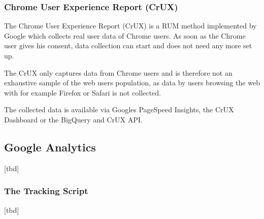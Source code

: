 







\subsubsection{Chrome User Experience Report (CrUX)}


The Chrome User Experience Report (CrUX) is a RUM method implemented by Google which collects real user data of Chrome users.
As soon as the Chrome user gives his consent, data collection can start and does not need any more set up.

The CrUX only captures data from Chrome users and is therefore not an exhaustive sample of the web users population, as data by users browsing the web with for example Firefox or Safari is not collected.

The collected data is available via Googles PageSpeed Insights, the CrUX Dashboard or the BigQuery and CrUX API. %







\subsection{Google Analytics}

[tbd]





\subsubsection{The Tracking Script}

[tbd]




